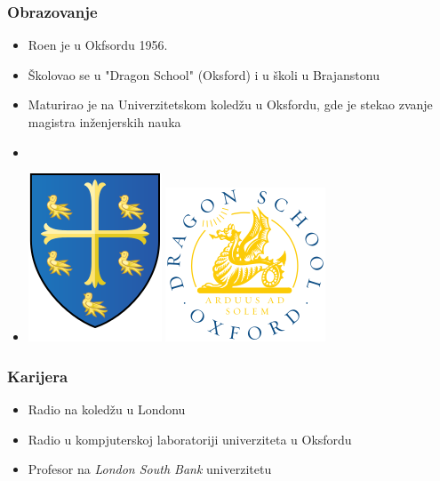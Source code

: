 \documentclass{beamer}
\def\d{{\fontencoding{T1}\selectfont\dj}}
\begin{document}
\begin{frame}
	\frametitle{Obrazovanje}
	\begin{itemize}
		\item Ro{\d}en je u Okfsordu 1956.
		\item Školovao se u "Dragon School" (Oksford) i u školi u Brajanstonu 
		\item Maturirao je na Univerzitetskom koledžu u Oksfordu, gde je stekao zvanje magistra inženjerskih nauka
		\item[]
		\item[] \begin{center} \includegraphics[scale=0.25]{University_College_Oxford_Coat_Of_Arms.png} \hspace{25} \includegraphics[scale=0.3]{Dragon_Coat_Of_Arms.png} \end{center}
	\end{itemize}
\end{frame}

\begin{frame}
\frametitle{Karijera}
    \begin{itemize}
        \item Radio na koledžu u Londonu
        \item Radio u kompjuterskoj laboratoriji univerziteta u Oksfordu
        \item Profesor na \textit{London South Bank} univerzitetu
    \end{itemize}
\end{frame}
\end{document}
